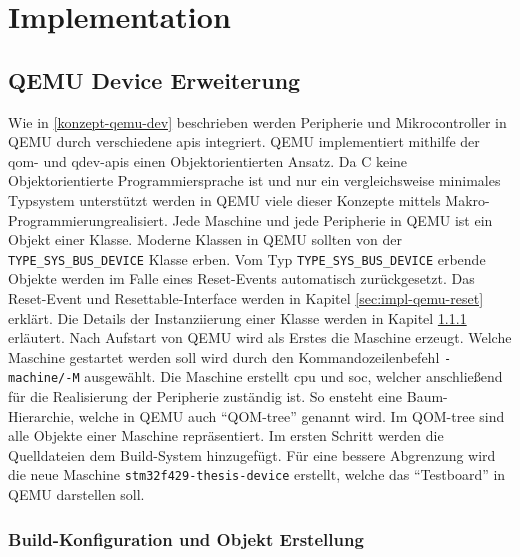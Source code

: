 

\clearpage

\chapter{Implementation}

\section{QEMU Device Erweiterung}

Wie in \ref{konzept-qemu-dev} beschrieben werden Peripherie und Mikrocontroller
in QEMU durch verschiedene \acp{api} integriert.
QEMU implementiert mithilfe der \ac{qom}- und \ac{qdev}-\acp{api} einen
Objektorientierten Ansatz.
Da C keine Objektorientierte Programmiersprache ist und nur ein vergleichsweise
minimales Typsystem unterstützt werden in QEMU viele dieser Konzepte mittels
Makro-Programmierung\footnotemark[1] realisiert.
\newline
Jede Maschine und jede Peripherie in QEMU ist ein Objekt einer Klasse.
Moderne Klassen in QEMU sollten von der \texttt{TYPE\_SYS\_BUS\_DEVICE} Klasse
erben.
Vom Typ \texttt{TYPE\_SYS\_BUS\_DEVICE} erbende Objekte werden im Falle eines
Reset-Events automatisch zurückgesetzt.
Das Reset-Event und Resettable-Interface werden in Kapitel
\ref{sec:impl-qemu-reset} erklärt.
Die Details der Instanziierung einer Klasse werden in Kapitel
\ref{sec:impl-qemu-device-build-obj} erläutert.
\newline
Nach Aufstart von QEMU wird als Erstes die Maschine erzeugt.
Welche Maschine gestartet werden soll wird durch den Kommandozeilenbefehl
\texttt{-machine/-M} ausgewählt.
Die Maschine erstellt \ac{cpu} und \ac{soc}, welcher anschließend für die
Realisierung der Peripherie zuständig ist.
So ensteht eine Baum-Hierarchie, welche in QEMU auch \enquote{QOM-tree} genannt
wird.
Im QOM-tree sind alle Objekte einer Maschine repräsentiert.
\newline
Im ersten Schritt werden die Quelldateien dem Build-System hinzugefügt.
Für eine bessere Abgrenzung wird die neue Maschine
\texttt{stm32f429-thesis-device} erstellt, welche das \enquote{Testboard} in
QEMU darstellen soll.

\subsection{Build-Konfiguration und Objekt Erstellung}
\label{sec:impl-qemu-device-build-obj}


